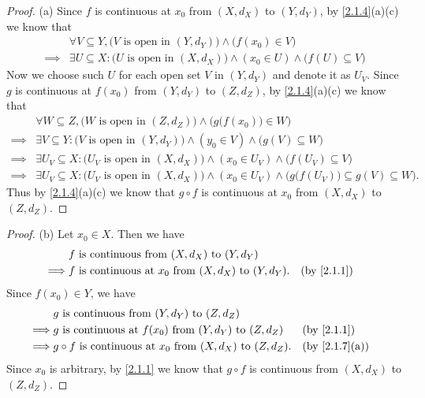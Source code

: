 \begin{proof}{(a)}
  Since \(f\) is continuous at \(x_0\) from \((X, d_X)\) to \((Y, d_Y)\), by \cref{2.1.4}(a)(c) we know that
  \begin{align*}
             & \forall V \subseteq Y, \big(V \text{ is open in } (Y, d_Y)\big) \land \big(f(x_0) \in V\big)                        \\
    \implies & \exists U \subseteq X : \big(U \text{ is open in } (X, d_X)\big) \land (x_0 \in U) \land \big(f(U) \subseteq V\big)
  \end{align*}
  Now we choose such \(U\) for each open set \(V\) in \((Y, d_Y)\) and denote it as \(U_V\).
  Since \(g\) is continuous at \(f(x_0)\) from \((Y, d_Y)\) to \((Z, d_Z)\), by \cref{2.1.4}(a)(c) we know that
  \begin{align*}
             & \forall W \subseteq Z, \big(W \text{ is open in } (Z, d_Z)\big) \land \Big(g\big(f(x_0)\big) \in W\Big)                                                \\
    \implies & \exists V \subseteq Y : \big(V \text{ is open in } (Y, d_Y)\big) \land (y_0 \in V) \land \big(g(V) \subseteq W\big)                                    \\
    \implies & \exists U_V \subseteq X : \big(U_V \text{ is open in } (X, d_X)\big) \land (x_0 \in U_V) \land \big(f(U_V) \subseteq V\big)                            \\
    \implies & \exists U_V \subseteq X : \big(U_V \text{ is open in } (X, d_X)\big) \land (x_0 \in U_V) \land \Big(g\big(f(U_V)\big) \subseteq g(V) \subseteq W\Big).
  \end{align*}
  Thus by \cref{2.1.4}(a)(c) we know that \(g \circ f\) is continuous at \(x_0\) from \((X, d_X)\) to \((Z, d_Z)\).
\end{proof}

\begin{proof}{(b)}
  Let \(x_0 \in X\).
  Then we have
  \begin{align*}
             & f \text{ is continuous from } (X, d_X) \text{ to } (Y, d_Y)                                  \\
    \implies & f \text{ is continuous at } x_0 \text{ from } (X, d_X) \text{ to } (Y, d_Y). &  & \by{2.1.1}
  \end{align*}
  Since \(f(x_0) \in Y\), we have
  \begin{align*}
             & g \text{ is continuous from } (Y, d_Y) \text{ to } (Z, d_Z)                                                           \\
    \implies & g \text{ is continuous at } f(x_0) \text{ from } (Y, d_Y) \text{ to } (Z, d_Z)       &  & \by{2.1.1}                  \\
    \implies & g \circ f \text{ is continuous at } x_0 \text{ from } (X, d_X) \text{ to } (Z, d_Z). &  & \text{(by \cref{2.1.7}(a))}
  \end{align*}
  Since \(x_0\) is arbitrary, by \cref{2.1.1} we know that \(g \circ f\) is continuous from \((X, d_X)\) to \((Z, d_Z)\).
\end{proof}

